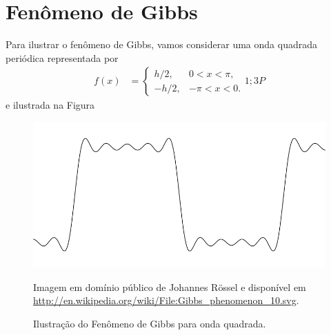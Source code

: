 \section{Fen\^{o}meno de Gibbs}
Para ilustrar o fen\^{o}meno de Gibbs, vamos considerar uma onda quadrada peri\'{o}dica representada por
\begin{align*}
    f(x) &= \begin{cases}
        h/2, & 0 < x < \pi, \\
        -h/2, & -\pi < x < 0.
    \end{cases}
    1;3P
\end{align*}
e ilustrada na Figura
\begin{figure}[!htb]
    \centering
    \includegraphics[width=.5\textwidth]{figuras/gibbs_phenomenon.png}
    \begin{flushright}
        Imagem em dom\'{i}nio p\'{u}blico de Johannes Rössel e dispon\'{i}vel em \url{http://en.wikipedia.org/wiki/File:Gibbs_phenomenon_10.svg}.
    \end{flushright}
    \caption{Ilustra\c{c}\~{a}o do Fen\^{o}meno de Gibbs para onda quadrada.}
    \label{fig:fenom_gibbs}
\end{figure}


